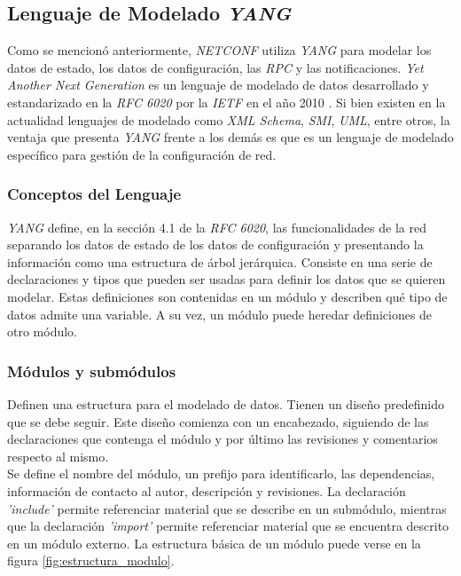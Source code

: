   \subsection{Lenguaje de Modelado \textit{YANG}}
  Como se mencionó anteriormente, \textit{NETCONF} utiliza \textit{YANG} para modelar los datos de estado, los datos de configuración, las \textit{RPC} y las notificaciones. \textit{Yet Another Next Generation} es un lenguaje de modelado de datos desarrollado y estandarizado en la \textit{RFC 6020} por la \textit{IETF} en el año 2010 \parencite{yangrfc}. Si bien existen en la actualidad lenguajes de modelado como \textit{XML Schema}, \textit{SMI}, \textit{UML}, entre otros, la ventaja que presenta \textit{YANG} frente a los demás es que es un lenguaje de modelado específico para gestión de la configuración de red.

  \subsubsection{Conceptos del Lenguaje}
  \textit{YANG} define, en la sección 4.1 de la \textit{RFC 6020}, las funcionalidades de la red separando los datos de estado de los datos de configuración y presentando la información como una estructura de árbol jerárquica. Consiste en una serie de declaraciones y tipos que pueden ser usadas para definir los datos que se quieren modelar. Estas definiciones son contenidas en un módulo y describen qué tipo de datos admite una variable. A su vez, un módulo puede heredar definiciones de otro módulo.

  \subsubsection{Módulos y submódulos}
  Definen una estructura para el modelado de datos. Tienen un diseño predefinido que se debe seguir. Este diseño comienza con un encabezado, siguiendo de las declaraciones que contenga el módulo y por último las revisiones y comentarios respecto al mismo. 
  \\

  Se define el nombre del módulo, un prefijo para identificarlo, las dependencias, información de contacto al autor, descripción y revisiones. La declaración \textit{'include'} permite referenciar material que se describe en un submódulo, mientras que la declaración \textit{'import'} permite referenciar material que se encuentra descrito en un módulo externo. La estructura básica de un módulo puede verse en la figura \ref{fig:estructura_modulo}.

